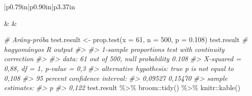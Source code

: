 \documentclass[
]{book}
\newenvironment{Shaded}{\begin{snugshade}}{\end{snugshade}}
\newcommand{\AttributeTok}[1]{\textcolor[rgb]{0.77,0.63,0.00}{#1}}
\newcommand{\CommentTok}[1]{\textcolor[rgb]{0.56,0.35,0.01}{\textit{#1}}}
\newcommand{\DecValTok}[1]{\textcolor[rgb]{0.00,0.00,0.81}{#1}}
\newcommand{\FloatTok}[1]{\textcolor[rgb]{0.00,0.00,0.81}{#1}}
\newcommand{\FunctionTok}[1]{\textcolor[rgb]{0.00,0.00,0.00}{#1}}
\newcommand{\NormalTok}[1]{#1}
\newcommand{\OtherTok}[1]{\textcolor[rgb]{0.56,0.35,0.01}{#1}}
\newcommand{\SpecialCharTok}[1]{\textcolor[rgb]{0.00,0.00,0.00}{#1}}
\begin{document}
\begin{longtable}[c]{|p{0.79in}|p{0.90in}|p{3.37in}}
 \\

\endfoot



 &  &  \\




\end{longtable}

\begin{Shaded}
\begin{Highlighting}[]

\CommentTok{\# Arány{-}próba}
\NormalTok{test.result }\OtherTok{\textless{}{-}} \FunctionTok{prop.test}\NormalTok{(}\AttributeTok{x =} \DecValTok{61}\NormalTok{, }\AttributeTok{n =} \DecValTok{500}\NormalTok{, }\AttributeTok{p =} \FloatTok{0.108}\NormalTok{)}
\NormalTok{test.result   }\CommentTok{\# hagyományos R output}
\CommentTok{\#\textgreater{} }
\CommentTok{\#\textgreater{}  1{-}sample proportions test with continuity correction}
\CommentTok{\#\textgreater{} }
\CommentTok{\#\textgreater{} data:  61 out of 500, null probability 0.108}
\CommentTok{\#\textgreater{} X{-}squared = 0,88, df = 1, p{-}value = 0,3}
\CommentTok{\#\textgreater{} alternative hypothesis: true p is not equal to 0,108}
\CommentTok{\#\textgreater{} 95 percent confidence interval:}
\CommentTok{\#\textgreater{}  0,09527 0,15470}
\CommentTok{\#\textgreater{} sample estimates:}
\CommentTok{\#\textgreater{}     p }
\CommentTok{\#\textgreater{} 0,122}
\NormalTok{test.result }\SpecialCharTok{\%\textgreater{}\%}\NormalTok{ broom}\SpecialCharTok{::}\FunctionTok{tidy}\NormalTok{() }\SpecialCharTok{\%\textgreater{}\%}\NormalTok{ knitr}\SpecialCharTok{::}\FunctionTok{kable}\NormalTok{()}
\end{Highlighting}
\end{Shaded}
\end{document}
